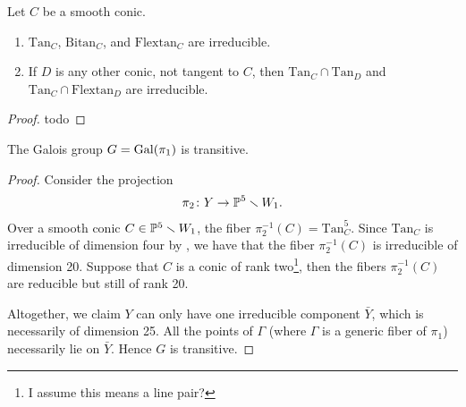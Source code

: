 \documentclass[11pt]{amsart}
\providecommand{\Bitan}{\mathrm{Bitan}}
\providecommand{\Flextan}{\mathrm{Flextan}}
\providecommand{\Tan}{\mathrm{Tan}}
\begin{document}
\begin{proposition} 
\label{prop:irreducibility-conic-loci}
Let $C$ be a smooth conic.
\begin{enumerate}
    \item $\Tan_C$, $\Bitan_C$, and $\Flextan_C$ are irreducible.
    \item If $D$ is any other conic, not tangent to $C$, then $\Tan_C \cap \Tan_D$ and $\Tan_C \cap \Flextan_D$ are irreducible.
\end{enumerate}
\end{proposition}
\begin{proof}
todo
\end{proof}

\begin{proposition} The Galois group $G = \mathrm{Gal}(\pi_1)$ is transitive.
\end{proposition}
\begin{proof} Consider the projection
\begin{align*}
    \pi_2 \colon Y \to \mathbb{P}^5 \smallsetminus W_1.
\end{align*}
Over a smooth conic $C \in \mathbb{P}^5 \smallsetminus W_1$, the fiber $\pi_2^{-1}(C) = \Tan_C^5$. Since $\Tan_C$ is irreducible of dimension four by , we have that the fiber $\pi_2^{-1}(C)$ is irreducible of dimension 20. Suppose that $C$ is a conic of rank two\footnote{I assume this means a line pair?}, then the fibers $\pi_2^{-1}(C)$ are reducible but still of rank 20.

Altogether, we claim $Y$ can only have one irreducible component $\bar{Y}$, which is necessarily of dimension 25. All the points of $\Gamma$ (where $\Gamma$ is a generic fiber of $\pi_1$) necessarily lie on $\bar{Y}$. Hence $G$ is transitive.
\end{proof}
\end{document}
